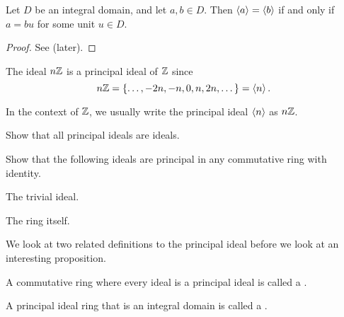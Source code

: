 \begin{proposition}\label{prop-principal-ideals-equal-iff-associates}
    Let $D$ be an integral domain, and let $a,b\in D$. Then $\left\langle a\right\rangle = \left\langle b\right\rangle$ if and only if $a = bu$ for some unit $u \in D$.
\end{proposition}
\begin{proof}
    See  (later).
\end{proof}

\begin{example}
    The ideal $n\mathbb{Z}$ is a principal ideal of $\mathbb{Z}$ since
    \[
        n\mathbb{Z} = \{\dots, -2n, -n, 0, n, 2n, \dots\} = \left\langle n\right\rangle.
    \]
\end{example}
\begin{remark}
    In the context of $\mathbb{Z}$, we usually write the principal ideal $\left\langle n\right\rangle$ as $n\mathbb{Z}$.
\end{remark}

\begin{exercise}\label{exercise-principal-ideal-is-ideal}
    Show that all principal ideals are ideals.
\end{exercise}

\begin{exercise}\label{exercise-trivial-ideal-and-whole-ring-are-principal-ideals}
    Show that the following ideals are principal in any commutative ring with identity.
    \begin{partquestions}{\alph*}
        \item The trivial ideal.
        \item The ring itself.
    \end{partquestions}
\end{exercise}

We look at two related definitions to the principal ideal before we look at an interesting proposition.
\begin{definition}
    A commutative ring where every ideal is a principal ideal is called a .
\end{definition}
\begin{definition}
    A principal ideal ring that is an integral domain is called a .
\end{definition}

